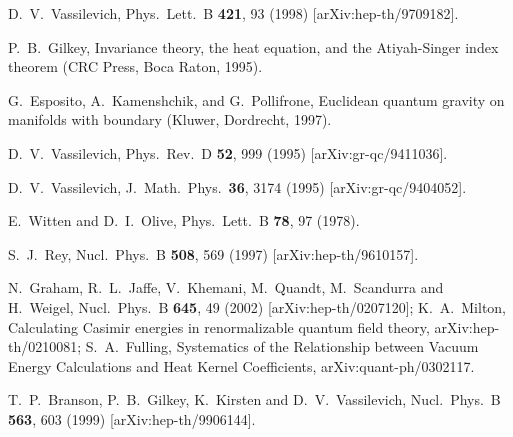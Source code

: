 \documentclass[a4paper,12pt]{article}
\begin{document}
\begin{thebibliography}{99}
D.~V.~Vassilevich,
Phys.\ Lett.\ B {\bf 421}, 93 (1998)
[arXiv:hep-th/9709182].

P.~B.~Gilkey, Invariance theory, the heat equation, and the Atiyah-Singer
index theorem (CRC Press, Boca Raton, 1995).

G.~Esposito, A.~Kamenshchik, and G.~Pollifrone, Euclidean quantum gravity on
manifolds with boundary (Kluwer, Dordrecht, 1997).

D.~V.~Vassilevich,
Phys.\ Rev.\ D {\bf 52}, 999 (1995)
[arXiv:gr-qc/9411036].

D.~V.~Vassilevich,
J.\ Math.\ Phys.\  {\bf 36}, 3174 (1995)
[arXiv:gr-qc/9404052].

E.~Witten and D.~I.~Olive,
Phys.\ Lett.\ B {\bf 78}, 97 (1978).

S.~J.~Rey,
Nucl.\ Phys.\ B {\bf 508}, 569 (1997)
[arXiv:hep-th/9610157].

N.~Graham, R.~L.~Jaffe, V.~Khemani, M.~Quandt, M.~Scandurra and H.~Weigel,
Nucl.\ Phys.\ B {\bf 645}, 49 (2002)
[arXiv:hep-th/0207120];
K.~A.~Milton,
Calculating Casimir energies in renormalizable quantum field theory,
arXiv:hep-th/0210081;
S.~A.~Fulling,
Systematics of the Relationship between Vacuum Energy 
Calculations and Heat Kernel Coefficients,
arXiv:quant-ph/0302117.

T.~P.~Branson, P.~B.~Gilkey, K.~Kirsten and D.~V.~Vassilevich,
Nucl.\ Phys.\ B {\bf 563}, 603 (1999)
[arXiv:hep-th/9906144].
\end{thebibliography}
\end{document}
